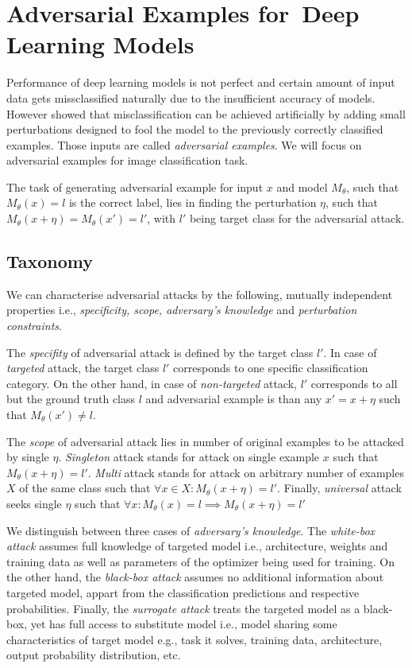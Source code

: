 \chapter{Adversarial Examples for~Deep Learning Models}
\label{sec:advex}
Performance of deep learning models is not perfect and certain amount of input data gets missclassified naturally due to the insufficient accuracy of models. However \cite{DBLP:journals/corr/SzegedyZSBEGF13} showed that misclassification can be achieved artificially by adding small perturbations designed to fool the model to the previously correctly classified examples. Those inputs are called \emph{adversarial examples}. We will focus on adversarial examples for image classification task.

The task of generating adversarial example for input $x$ and model $M_\theta$, such that $M_\theta(x) = l$ is the correct label, lies in finding the perturbation $\eta$, such that $M_\theta(x + \eta) = M_\theta(x') = l'$, with $l'$ being target class for the adversarial attack.

\section{Taxonomy}
\label{sec:advex_taxonomy}
We can characterise adversarial attacks by the following, mutually independent properties i.e., \emph{specificity, scope, adversary's knowledge} and \emph{perturbation constraints}.

The \emph{specifity} of adversarial attack is defined by the target class $l'$. In case of \emph{targeted} attack, the target class $l'$ corresponds to one specific classification category. On the other hand, in case of \emph{non-targeted} attack, $l'$ corresponds to all but the ground truth class $l$ and adversarial example is than any $x' = x + \eta$ such that $M_\theta(x') \neq l$.

The \emph{scope} of adversarial attack lies in number of original examples to be attacked by single $\eta$. \emph{Singleton} attack stands for attack on single example $x$ such that $M_\theta(x + \eta) = l'$. \emph{Multi} attack stands for attack on arbitrary number of examples  $X$ of the same class such that $\forall x \in X: M_\theta(x + \eta) = l'$. Finally, \emph{universal} attack seeks single $\eta$ such that $\forall x: M_\theta(x) = l \implies M_\theta(x + \eta) = l'$

We distinguish between three cases of \emph{adversary's knowledge}. The \emph{white-box attack} assumes full knowledge of targeted model i.e., architecture, weights and training data as well as parameters of the optimizer being used for training. On the other hand, the \emph{black-box attack} assumes no additional information about targeted model, appart from the classification predictions and respective probabilities. Finally, the \emph{surrogate attack} treats the targeted model as a black-box, yet has full access to substitute model i.e., model sharing some characteristics of target model e.g., task it solves, training data, architecture, output probability distribution, etc.

